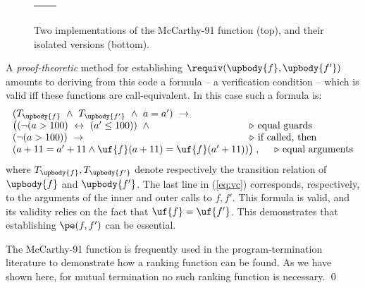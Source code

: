 {\begin{example}
\begin{figure}
\begin{tabular}{p{6 cm}|p{6 cm}}
\begin{algorithmic}
\EndFunction
\end{algorithmic} \\ \hline
\end{tabular}
\caption{Two implementations of the McCarthy-91 function (top), and their isolated versions (bottom).}\label{fig:mccarthy}

\end{figure}

A \emph{proof-theoretic} method for establishing $\requiv(\upbody{f},
\upbody{f'})$ amounts to deriving from this code a formula -- a verification
condition -- which is valid iff these functions are call-equivalent. In this
case such a formula is:
\begin{equation} \label{eq:vc}
\begin{array}{l}
(T_{\upbody{f}} \ \land\ T_{\upbody{f'}}\ \land\ a = a')\ \rightarrow \\
\big((\lnot (a > 100)\ \leftrightarrow\ (a' \leq 100))\ \land \hspace{3.5 cm} \triangleright \mbox{ equal guards}\\
(\lnot (a > 100))\ \rightarrow\ \hspace{5.73 cm} \triangleright \mbox{ if called, then  }  \\
(a + 11 = a' + 11 \land \uf{f}(a+11) = \uf{f}(a' + 11))\big)\;, \hspace{0.50 cm} \triangleright \mbox{ equal arguments}
\end{array}
\end{equation}
%
where $T_{\upbody{f}},T_{\upbody{f'}}$ denote respectively the transition
relation of $\upbody{f}$ and $\upbody{f'}$. The last
line in (\ref{eq:vc}) corresponds, respectively, to the arguments of the inner
and outer calls to $f,f'$. This formula is valid, and its validity relies on
the fact that $\uf{f} = \uf{f'}$. This demonstrates that establishing
$\pe(f,f')$ can be essential.

The McCarthy-91 function is frequently used in the program-termination literature to demonstrate how a ranking function can be found. As we have shown here, for mutual termination no such ranking function is necessary.
\qed
\end{example}

}





